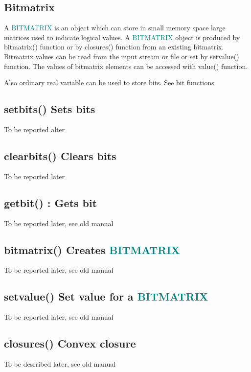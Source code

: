 \subsection{Bitmatrix} 
\label{bitmatrixo} 
A \textcolor{teal}{BITMATRIX} is an object which can store in small memory space large matrices 
used to indicate logical values. A \textcolor{teal}{BITMATRIX} object is produced by \textcolor{VioletRed}{bitmatrix}() 
function or by \textcolor{VioletRed}{closures}() function from an existing bitmatrix. Bitmatrix values 
can be read from the input stream or file or set by \textcolor{VioletRed}{setvalue}() function. The 
values of bitmatrix elements can be accessed with \textcolor{VioletRed}{value}() function. 
\begin{note} 
Also ordinary real variable can be used to store bits. See bit functions. 
\end{note} 
\subsection{\textcolor{VioletRed}{setbits}() Sets bits} 
\label{setbits} 
To be reported alter 
\subsection{\textcolor{VioletRed}{clearbits}() Clears bits} 
\label{clearbits} 
To be reported later 
\subsection{\textcolor{VioletRed}{getbit}() : Gets bit} 
\label{getbit} 
To be reported later, see old manual 
\subsection{\textcolor{VioletRed}{bitmatrix}() Creates \textcolor{teal}{BITMATRIX}} 
\label{bitmatrix} 
To be reported later,  see old manual 
\subsection{\textcolor{VioletRed}{setvalue}() Set value for a \textcolor{teal}{BITMATRIX}} 
\label{setvalue} 
To be reported later,  see old manual 
\subsection{\textcolor{VioletRed}{closures}() Convex closure} 
\label{closures} 
To be desrribed later,  see old manual 
